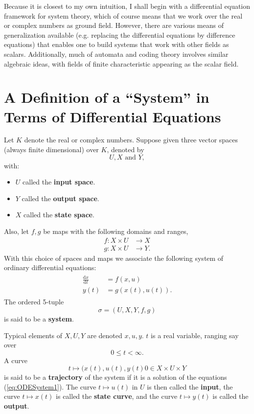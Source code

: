\documentclass[12pt]{book}
\theoremstyle{plain}
\theoremstyle{definition}
\newcommand{\dd}[1]{\mathrm{d}#1}
\begin{document}
Because it is closest to my own intuition, I shall begin with a differential equation framework for system theory, which of course means that we work over the real or complex numbers as ground field.
However, there are various means of generalization available (e.g. replacing the differential equations by difference equations) that enables one to build systems that work with other fields as scalars.
Additionally, much of automata and coding theory involves similar algebraic ideas, with fields of finite characteristic appearing as the scalar field.

\section{A Definition of a ``System'' in Terms of Differential Equations}

Let $K$ denote the real or complex numbers.
Suppose given three vector spaces (always finite dimensional) over $K$, denoted by
$$U, X \text{ and } Y,$$
with:
\begin{itemize}
    \item $U$ called the \textbf{input space}.
    \item $Y$ called the \textbf{output space}.
    \item $X$ called the \textbf{state space}.
\end{itemize}
Also, let $f, g$ be maps with the following domains and ranges,
\begin{align}
    f: X \times U &\to X \\
    g: X \times U &\to Y.
\end{align}
With this choice of spaces and maps we associate the following system of ordinary differential equations:
\begin{align}
\begin{split} \label{eq:ODESystem1}
    \frac{\dd{x}}{\dd{t}} &= f(x, u) \\
    y(t) &= g(x(t), u(t)).
\end{split}
\end{align}
The ordered 5-tuple
$$\sigma = (U, X, Y, f, g)$$
is said to be a \textbf{system}.

Typical elements of $X, U, Y$ are denoted $x, u, y$. $t$ is a real variable, ranging say over
$$0 \leq t < \infty.$$
A curve
$$t \mapsto (x(t), u(t), y(t)0 \in X \times U \times Y$$
is said to be a \textbf{trajectory} of the system if it is a solution of the equations (\ref{eq:ODESystem1}).
The curve $t \mapsto u(t)$ in $U$ is then called the \textbf{input}, the curve $t \mapsto x(t)$ is called the \textbf{state curve}, and the curve $t \mapsto y(t)$ is called the \textbf{output}.
\end{document}
